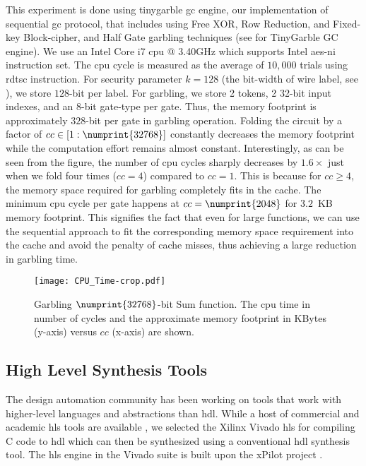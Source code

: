This experiment is done using \gls{tinygarble} \acrshort{gc} engine, our  implementation of sequential \acrshort{gc} protocol, that includes using Free XOR, Row Reduction, and Fixed-key Block-cipher, and Half Gate garbling techniques (see  for TinyGarble GC engine).
We use an Intel Core i7 \acrshort{cpu} @ 3.40GHz which supports Intel \acrfull{aes-ni} instruction set.
The \acrshort{cpu} cycle is measured as the average of $10,000$ trials using \gls{rdtsc} instruction.
For security parameter $k=128$ (the bit-width of wire label, see ), we store $128$-bit per label.
For garbling, we store 2 tokens, 2 32-bit input indexes, and an 8-bit gate-type per gate.
Thus, the memory footprint is approximately $328$-bit per gate in garbling operation.
Folding the circuit by a factor of $cc \in [1:\numprint{32768}]$ constantly decreases the memory footprint while the computation effort remains almost constant.
Interestingly, as can be seen from the figure, the number of \acrshort{cpu} cycles sharply decreases by $1.6\times$ just when we fold four times ($cc=4$) compared to $cc=1$.
This is because for $cc \geq 4$, the memory space required for garbling completely fits in the cache.
The minimum \acrshort{cpu} cycle per gate happens at $cc=\numprint{2048}$ for $3.2$~KB memory footprint.
This signifies the fact that even for large functions, we can use the sequential approach to fit the corresponding memory space requirement into the cache and avoid the penalty of cache misses, thus achieving a large reduction in garbling time.

\begin{figure}[t]
	\centering
	\texttt{[image: CPU\_Time-crop.pdf]}
	\caption{Garbling $\numprint{32768}$-bit Sum function.
The \acrshort{cpu} time in number of cycles and the approximate memory footprint in KBytes (y-axis) versus $cc$ (x-axis) are shown.}
	\label{fig:cpu_time}
\end{figure}

\subsection{High Level Synthesis Tools}\label{ssec:eval-tinygarble-high}
The design automation community has been working on tools that work with higher-level languages and abstractions than \acrshort{hdl}.
While a host of commercial and academic \acrshort{hls} tools are available \cite{tool:Vivado, tool:PandA, decaluwe2004myhdl, Gupta2004}, we selected the Xilinx Vivado \acrshort{hls} for compiling C code to \acrshort{hdl} which can then be synthesized using a conventional \acrshort{hdl} synthesis tool.
The \acrshort{hls} engine in the Vivado suite is built upon the xPilot project \cite{Chapter:Zhang2008}.

